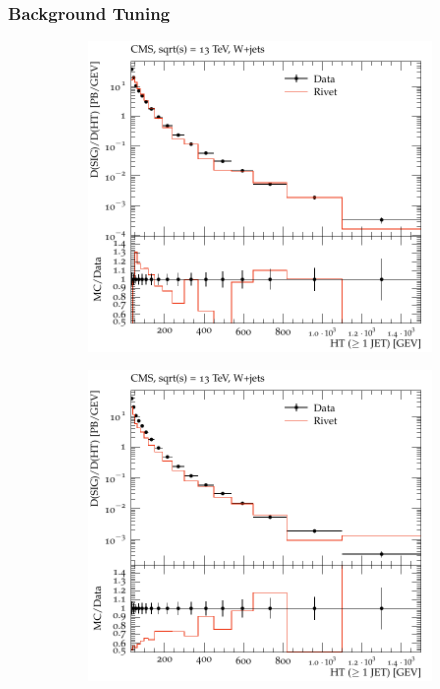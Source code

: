 \documentclass{beamer}
\begin{document}

\begin{frame}
\frametitle{Background Tuning}

\begin{figure}[!h]

\begin{subfigure}[b]{0.44\textwidth}
\centering
\includegraphics[width=\textwidth]{pictures/MCTunig/HT}
\caption{\label{HTTune}}
\end{subfigure}
\begin{subfigure}[b]{0.44\textwidth}
\centering
\includegraphics[width=\textwidth]{pictures/MCTunig/HT_Nelson}
\caption{\label{HT}}
\end{subfigure}
\caption{  }
\end{figure}



\end{frame}
\end{document}
